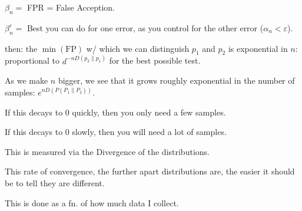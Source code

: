 $\beta_n = $ FPR = False Acception. 

$\beta_n^\varepsilon = $ Best you can do for one error, as you control for the other error ($\alpha_n < \varepsilon$).

then: the $\min(\text{FP})$ w/ which we can distinguish $p_1$ and $p_2$ is exponential in $n$: proportional to $d^{-n D(p_2 \| p_1)}$ for the best possible test.

As we make $n$ bigger, we see that it grows roughly exponential in the number of samples: $e^{n D(P(P_1 \| P_2))}$.

If this decays to 0 quickly, then you only need a few samples.

If this decays to 0 slowly, then you will need a lot of samples.

This is measured via the Divergence of the distributions.

\begin{shaded}
This rate of convergence, the further apart distributions are, the easier it should be to tell they are different.
\end{shaded}

This is done as a fn. of how much data I collect.



